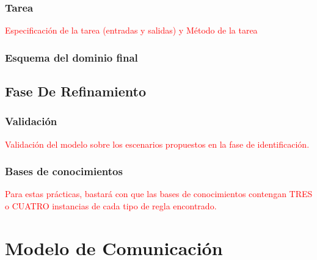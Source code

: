 \documentclass[12pt,a4paper,twoside,spanish]{article}      %
\begin{document}
\subsubsection{Tarea}
\textcolor {red} {Especificación de la tarea (entradas y salidas) y Método de la tarea}

\subsubsection{Esquema del dominio final}



\subsection{Fase De Refinamiento}


\subsubsection{Validación}

\textcolor {red} {Validación del modelo sobre los escenarios propuestos en la fase de identificación.}

\subsubsection{Bases de conocimientos}

\textcolor {red} {Para estas prácticas, bastará con que las bases de conocimientos contengan TRES o CUATRO instancias de cada tipo de regla encontrado.}

\section{Modelo de Comunicación}
\end{document}
